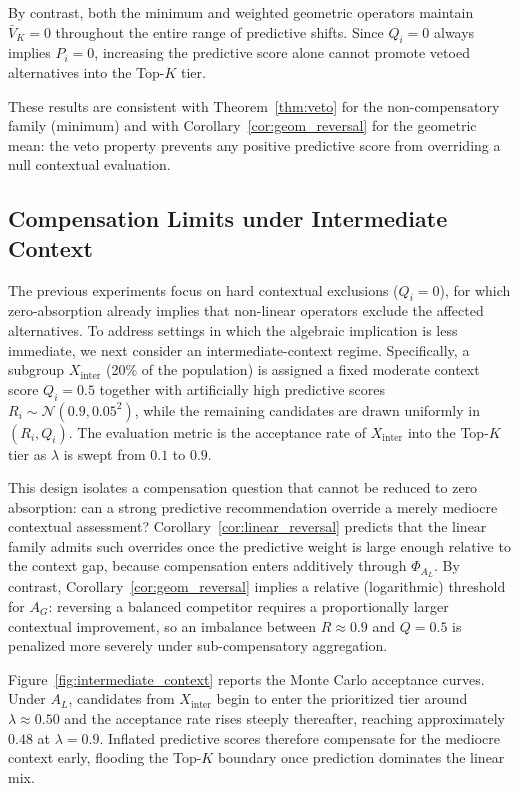 \documentclass[mathematics,article,submit,moreauthors]{Definitions/mdpi}
\begin{document}
By contrast, both the minimum and weighted geometric operators maintain $\bar{V}_K=0$ throughout the entire range of predictive shifts. Since $Q_i=0$ always implies $P_i=0$, increasing the predictive score alone cannot promote vetoed alternatives into the Top-$K$ tier.

{\color{red}These results are consistent with Theorem~\ref{thm:veto} for the non-compensatory family (minimum) and with Corollary~\ref{cor:geom_reversal} for the geometric mean: the veto property prevents any positive predictive score from overriding a null contextual evaluation.}

{\color{red}
\subsection{Compensation Limits under Intermediate Context}
\label{subsect:intermediate_context}

The previous experiments focus on hard contextual exclusions ($Q_i=0$), for which zero-absorption already implies that non-linear operators exclude the affected alternatives. To address settings in which the algebraic implication is less immediate, we next consider an intermediate-context regime. Specifically, a subgroup $X_{\mathrm{inter}}$ (20\% of the population) is assigned a fixed moderate context score $Q_i=0.5$ together with artificially high predictive scores $R_i\sim\mathcal{N}(0.9,0.05^2)$, while the remaining candidates are drawn uniformly in $(R_i,Q_i)$. The evaluation metric is the acceptance rate of $X_{\mathrm{inter}}$ into the Top-$K$ tier as $\lambda$ is swept from $0.1$ to $0.9$.

This design isolates a compensation question that cannot be reduced to zero absorption: can a strong predictive recommendation override a merely mediocre contextual assessment? Corollary~\ref{cor:linear_reversal} predicts that the linear family admits such overrides once the predictive weight is large enough relative to the context gap, because compensation enters additively through $\Phi_{A_L}$. By contrast, Corollary~\ref{cor:geom_reversal} implies a relative (logarithmic) threshold for $A_G$: reversing a balanced competitor requires a proportionally larger contextual improvement, so an imbalance between $R\approx 0.9$ and $Q=0.5$ is penalized more severely under sub-compensatory aggregation.

Figure~\ref{fig:intermediate_context} reports the Monte Carlo acceptance curves. Under $A_L$, candidates from $X_{\mathrm{inter}}$ begin to enter the prioritized tier around $\lambda\approx 0.50$ and the acceptance rate rises steeply thereafter, reaching approximately $0.48$ at $\lambda=0.9$. Inflated predictive scores therefore compensate for the mediocre context early, flooding the Top-$K$ boundary once prediction dominates the linear mix.

}
\end{document}
